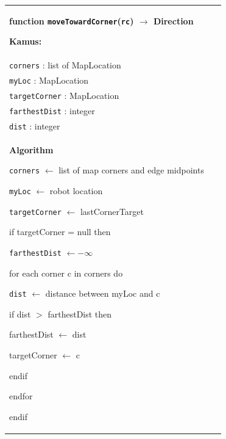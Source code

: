 \documentclass{article}
\newenvironment{pseudobox}
{
\centering
\begin{longtable}{|p{0.94\linewidth}|}
\hline
}
{
\\ \hline
\end{longtable}
\vspace{0.05cm}
}
\begin{document}
\begin{enumerate}[label=\alph*.]
\begin{pseudobox}
\textbf{function \texttt{moveTowardCorner}(\texttt{rc}) $\rightarrow$ Direction}

\textbf{Kamus:} \\
\hspace*{1.5em}\texttt{corners} : list of MapLocation \\
\hspace*{1.5em}\texttt{myLoc} : MapLocation \\
\hspace*{1.5em}\texttt{targetCorner} : MapLocation \\
\hspace*{1.5em}\texttt{farthestDist} : integer \\
\hspace*{1.5em}\texttt{dist} : integer \\

\textbf{Algorithm}

\hspace*{1.5em}\texttt{corners} $\leftarrow$ list of map corners and edge midpoints

\hspace*{1.5em}\texttt{myLoc} $\leftarrow$ robot location

\hspace*{1.5em}\texttt{targetCorner} $\leftarrow$ lastCornerTarget

\hspace*{1.5em}if targetCorner = null then

\hspace*{3em}\texttt{farthestDist} $\leftarrow -\infty$

\hspace*{3em}for each corner c in corners do

\hspace*{4.5em}\texttt{dist} $\leftarrow$ distance between myLoc and c

\hspace*{4.5em}if dist $>$ farthestDist then

\hspace*{6em}farthestDist $\leftarrow$ dist

\hspace*{6em}targetCorner $\leftarrow$ c

\hspace*{4.5em}endif

\hspace*{3em}endfor

\hspace*{1.5em}endif


\end{pseudobox}
\end{enumerate}
\end{document}
